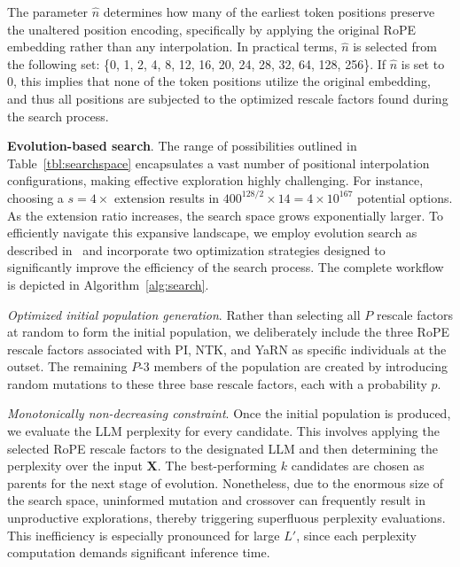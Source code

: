 The parameter $\hat{n}$ determines how many of the earliest token positions preserve the unaltered position encoding, specifically by applying the original RoPE embedding rather than any interpolation. In practical terms, $\hat{n}$ is selected from the following set: \{0, 1, 2, 4, 8, 12, 16, 20, 24, 28, 32, 64, 128, 256\}. If $\hat{n}$ is set to 0, this implies that none of the token positions utilize the original embedding, and thus all positions are subjected to the optimized rescale factors found during the search process.

\textbf{Evolution-based search}. The range of possibilities outlined in Table~\ref{tbl:searchspace} encapsulates a vast number of positional interpolation configurations, making effective exploration highly challenging. For instance, choosing a $s=4\times$ extension results in $400^{128/2}\times14=4\times10^{167}$ potential options. As the extension ratio increases, the search space grows exponentially larger. To efficiently navigate this expansive landscape, we employ evolution search as described in~\cite{guo2020single} and incorporate two optimization strategies designed to significantly improve the efficiency of the search process. The complete workflow is depicted in Algorithm~\ref{alg:search}.

\textit{Optimized initial population generation}. Rather than selecting all $P$ rescale factors at random to form the initial population, we deliberately include the three RoPE rescale factors associated with PI, NTK, and YaRN as specific individuals at the outset. The remaining $P$-3 members of the population are created by introducing random mutations to these three base rescale factors, each with a probability $p$.

\textit{Monotonically non-decreasing constraint}. Once the initial population is produced, we evaluate the LLM perplexity for every candidate. This involves applying the selected RoPE rescale factors to the designated LLM and then determining the perplexity over the input $\mathbf{X}$. The best-performing $k$ candidates are chosen as parents for the next stage of evolution. Nonetheless, due to the enormous size of the search space, uninformed mutation and crossover can frequently result in unproductive explorations, thereby triggering superfluous perplexity evaluations. This inefficiency is especially pronounced for large $L'$, since each perplexity computation demands significant inference time.

